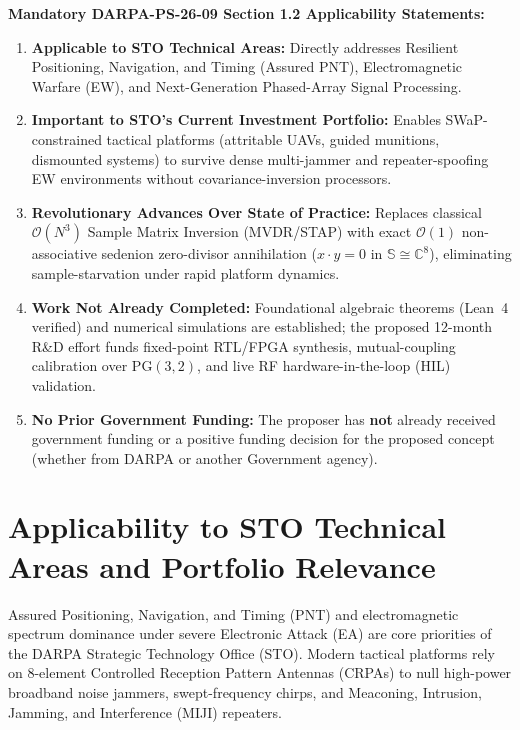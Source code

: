 \documentclass[12pt,letterpaper]{article}
\begin{document}
\vspace{4pt}
\textbf{Mandatory DARPA-PS-26-09 Section 1.2 Applicability Statements:}
\begin{enumerate}[leftmargin=16pt,itemsep=1pt,topsep=1pt]
    \item \textbf{Applicable to STO Technical Areas:} Directly addresses Resilient Positioning, Navigation, and Timing (Assured PNT), Electromagnetic Warfare (EW), and Next-Generation Phased-Array Signal Processing.
    \item \textbf{Important to STO's Current Investment Portfolio:} Enables SWaP-constrained tactical platforms (attritable UAVs, guided munitions, dismounted systems) to survive dense multi-jammer and repeater-spoofing EW environments without covariance-inversion processors.
    \item \textbf{Revolutionary Advances Over State of Practice:} Replaces classical $\mathcal{O}(N^3)$ Sample Matrix Inversion (MVDR/STAP) with exact $\mathcal{O}(1)$ non-associative sedenion zero-divisor annihilation ($x\cdot y = 0$ in $\mathbb{S}\cong\mathbb{C}^8$), eliminating sample-starvation under rapid platform dynamics.
    \item \textbf{Work Not Already Completed:} Foundational algebraic theorems (Lean~4 verified) and numerical simulations are established; the proposed 12-month R\&D effort funds fixed-point RTL/FPGA synthesis, mutual-coupling calibration over $\mathrm{PG}(3,2)$, and live RF hardware-in-the-loop (HIL) validation.
    \item \textbf{No Prior Government Funding:} The proposer has \textbf{not} already received government funding or a positive funding decision for the proposed concept (whether from DARPA or another Government agency).
\end{enumerate}

\newpage
\setcounter{page}{1}

\section{Applicability to STO Technical Areas and Portfolio Relevance}
Assured Positioning, Navigation, and Timing (PNT) and electromagnetic spectrum dominance under severe Electronic Attack (EA) are core priorities of the DARPA Strategic Technology Office (STO). Modern tactical platforms rely on 8-element Controlled Reception Pattern Antennas (CRPAs) to null high-power broadband noise jammers, swept-frequency chirps, and Meaconing, Intrusion, Jamming, and Interference (MIJI) repeaters.
\end{document}
